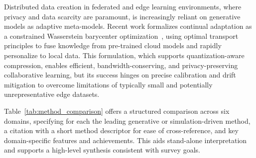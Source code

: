 \documentclass[sigconf]{acmart}
\begin{document}
Distributed data creation in federated and edge learning environments, where privacy and data scarcity are paramount, is increasingly reliant on generative models as adaptive meta-models. Recent work formalizes continual adaptation as a constrained Wasserstein barycenter optimization~\cite{ref72}, using optimal transport principles to fuse knowledge from pre-trained cloud models and rapidly personalize to local data. This formulation, which supports quantization-aware compression, enables efficient, bandwidth-conserving, and privacy-preserving collaborative learning, but its success hinges on precise calibration and drift mitigation to overcome limitations of typically small and potentially unrepresentative edge datasets.

Table~\ref{tab:method_comparison} offers a structured comparison across six domains, specifying for each the leading generative or simulation-driven method, a citation with a short method descriptor for ease of cross-reference, and key domain-specific features and achievements. This aids stand-alone interpretation and supports a high-level synthesis consistent with survey goals.
\end{document}
